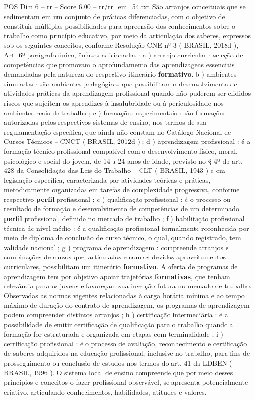 \begin{textsample}{POS Dim 6 – rr – Score 6.00 – rr/rr\_em\_54.txt}
São arranjos conceituais que se sedimentam em um conjunto de práticas diferenciadas, com o objetivo de constituir múltiplas possibilidades para apreensão dos conhecimentos sobre o trabalho como princípio educativo, por meio da articulação dos saberes, expressos sob os seguintes conceitos, conforme Resolução CNE nº 3 ( BRASIL, 2018d ), Art. 6º-parágrafo único, ênfases adicionadas : a ) arranjo curricular : seleção de competências que promovam o aprofundamento das aprendizagens essenciais demandadas pela natureza do respectivo itinerário \textbf{formativo}. b ) ambientes simulados : são ambientes pedagógicos que possibilitam o desenvolvimento de atividades práticas da aprendizagem profissional quando não puderem ser elididos riscos que sujeitem os aprendizes à insalubridade ou à periculosidade nos ambientes reais de trabalho ; c ) formações experimentais : são formações autorizadas pelos respectivos sistemas de ensino, nos termos de sua regulamentação específica, que ainda não constam no Catálogo Nacional de Cursos Técnicos – CNCT ( BRASIL, 2012d ) ; d ) aprendizagem profissional : é a formação técnico-profissional compatível com o desenvolvimento físico, moral, psicológico e social do jovem, de 14 a 24 anos de idade, previsto no § 4º do art. 428 da Consolidação das Leis do Trabalho – CLT ( BRASIL, 1943 ) e em legislação específica, caracterizada por atividades teóricas e práticas, metodicamente organizadas em tarefas de complexidade progressiva, conforme respectivo \textbf{perfil} profissional ; e ) qualificação profissional : é o processo ou resultado de formação e desenvolvimento de competências de um determinado \textbf{perfil} profissional, definido no mercado de trabalho ; f ) habilitação profissional técnica de nível médio : é a qualificação profissional formalmente reconhecida por meio de diploma de conclusão de curso técnico, o qual, quando registrado, tem validade nacional ; g ) programa de aprendizagem : compreende arranjos e combinações de cursos que, articulados e com os devidos aproveitamentos curriculares, possibilitam um itinerário \textbf{formativo}.
A oferta de programas de aprendizagem tem por objetivo apoiar trajetórias \textbf{formativas}, que tenham relevância para os jovens e favoreçam sua inserção futura no mercado de trabalho.
Observadas as normas vigentes relacionadas à carga horária mínima e ao tempo máximo de duração do contrato de aprendizagem, os programas de aprendizagem podem compreender distintos arranjos ; h ) certificação intermediária : é a possibilidade de emitir certificação de qualificação para o trabalho quando a formação for estruturada e organizada em etapas com terminalidade ; i ) certificação profissional : é o processo de avaliação, reconhecimento e certificação de saberes adquiridos na educação profissional, inclusive no trabalho, para fins de prosseguimento ou conclusão de estudos nos termos do art. 41 da LDBEN ( BRASIL, 1996 ).
O sistema local de ensino compreende que por meio desses princípios e conceitos o fazer profissional observável, se apresenta potencialmente criativo, articulando conhecimentos, habilidades, atitudes e valores.

\end{textsample}
